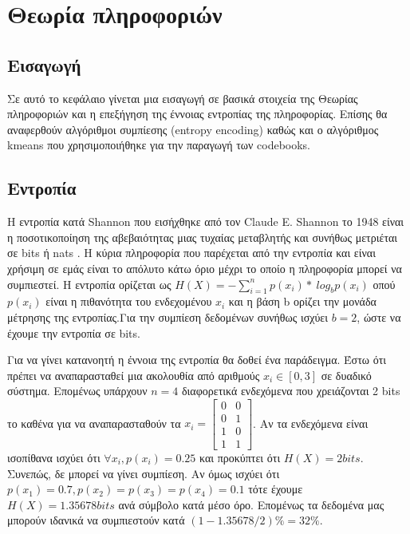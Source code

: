 ﻿\chapter{Θεωρία πληροφοριών}
\label{chapter:chap3}

\section{Εισαγωγή}
\label{section:sect31}

\indent Σε αυτό το κεφάλαιο γίνεται μια εισαγωγή σε βασικά στοιχεία της Θεωρίας πληροφοριών και η επεξήγηση της έννοιας εντροπίας της πληροφορίας. Επίσης θα αναφερθούν αλγόριθμοι συμπίεσης (entropy encoding) καθώς και ο αλγόριθμος kmeans που χρησιμοποιήθηκε για την παραγωγή των codebooks.

\section{Εντροπία}
\label{section:sect32}

\indent Η εντροπία κατά Shannon που εισήχθηκε από τον Claude E. Shannon το 1948 είναι η ποσοτικοποίηση της αβεβαιότητας μιας τυχαίας μεταβλητής και συνήθως μετριέται σε bits ή nats \cite{shannon}. Η κύρια πληροφορία που παρέχεται από την εντροπία και είναι χρήσιμη σε εμάς είναι το απόλυτο κάτω όριο μέχρι το οποίο η πληροφορία μπορεί να συμπιεστεί. Η εντροπία ορίζεται ως $ H(X) = -\sum_{i=1}^{n} p(x_i)*\ log_{b} p(x_i) $  οπού $p(x_i)$ είναι η πιθανότητα του ενδεχομένου $x_i$ και η βάση b ορίζει την μονάδα μέτρησης της εντροπίας.Για την συμπίεση δεδομένων συνήθως ισχύει $b=2$, ώστε να έχουμε την εντροπία σε bits.

\indent Για να γίνει κατανοητή η έννοια της εντροπία θα δοθεί ένα παράδειγμα. Έστω ότι πρέπει να αναπαρασταθεί μια ακολουθία από αριθμούς $x_i \in [0,3] $ σε δυαδικό σύστημα. Επομένως υπάρχουν $n=4$ διαφορετικά ενδεχόμενα που χρειάζονται 2 bits το καθένα για να αναπαρασταθούν τα
$x_i = \begin{bmatrix}
0 & 0 \\
0 & 1 \\
1 & 0 \\
1 & 1
\end{bmatrix} $. Αν τα ενδεχόμενα είναι ισοπίθανα ισχύει ότι $ \forall{x_i}, p(x_i)= 0.25 $ και προκύπτει ότι $ H(X) = 2bits $. Συνεπώς, δε μπορεί να γίνει συμπίεση. Αν όμως ισχύει ότι $ p(x_1) = 0.7, p(x_2)=p(x_3)=p(x_4)=0.1 $ τότε έχουμε $ H(X) = 1.35678 bits$ ανά σύμβολο κατά μέσο όρο. Επομένως τα δεδομένα μας μπορούν ιδανικά να συμπιεστούν κατά $(1-1.35678/2)\% = 32\%$.

